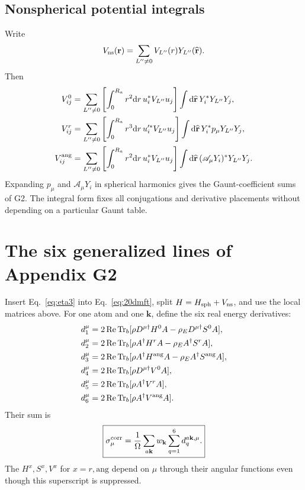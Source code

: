 \documentclass[11pt]{article}
\newcommand{\Tr}{\operatorname{Tr}}
\newcommand{\Rea}{\operatorname{Re}}
\newcommand{\dd}{\mathrm d}
\newcommand{\kb}{\mathbf k}
\newcommand{\rE}{{\rho_E}}
\newcommand{\newpart}[1]{\par\Needspace{12\baselineskip}\section{#1}}
\begin{document}
\subsection{Nonspherical potential integrals}
Write
\begin{equation}
 V_{\rm ns}(\mathbf r)=\sum_{L''\ne0}V_{L''}(r)Y_{L''}(\widehat{\mathbf r}).
\end{equation}
Then
\begin{align}
 V^0_{ij}&=\sum_{L''\ne0}
 \left[\int_0^{R_a}r^2\dd r\,u_i^*V_{L''}u_j\right]
 \int\dd\widehat{\mathbf r}\,Y_i^*Y_{L''}Y_j,\label{eq:V0}\\
 V^r_{ij}&=\sum_{L''\ne0}
 \left[\int_0^{R_a}r^3\dd r\,u_i'^*V_{L''}u_j\right]
 \int\dd\widehat{\mathbf r}\,Y_i^*p_\mu Y_{L''}Y_j,\label{eq:Vr}\\
 V^{\rm ang}_{ij}&=\sum_{L''\ne0}
 \left[\int_0^{R_a}r^2\dd r\,u_i^*V_{L''}u_j\right]
 \int\dd\widehat{\mathbf r}\,(\mathscr A_\mu Y_i)^*Y_{L''}Y_j.
 \label{eq:Va}
\end{align}
Expanding $p_\mu$ and $\mathscr A_\mu Y_i$ in spherical harmonics gives
the Gaunt-coefficient sums of G2. The integral form fixes all conjugations
and derivative placements without depending on a particular Gaunt table.

\newpart{The six generalized lines of Appendix G2}
\label{sec:g2}
Insert Eq.~\eqref{eq:eta3} into Eq.~\eqref{eq:20dmft}, split
$H=H_{\rm sph}+V_{\rm ns}$, and use the local matrices above.
For one atom and one $\kb$, define the six real energy derivatives:
\begin{align}
 d_1^\mu&=2\Rea\Tr_b[\rho D^{\mu\dagger}H^0A
                             -\rE D^{\mu\dagger}S^0A],\label{eq:g21}\\
 d_2^\mu&=2\Rea\Tr_b[\rho A^\dagger H^rA
                             -\rE A^\dagger S^rA],\label{eq:g22}\\
 d_3^\mu&=2\Rea\Tr_b[\rho A^\dagger H^{\rm ang}A
                             -\rE A^\dagger S^{\rm ang}A],\label{eq:g23}\\
 d_4^\mu&=2\Rea\Tr_b[\rho D^{\mu\dagger}V^0A],\label{eq:g24}\\
 d_5^\mu&=2\Rea\Tr_b[\rho A^\dagger V^rA],\label{eq:g25}\\
 d_6^\mu&=2\Rea\Tr_b[\rho A^\dagger V^{\rm ang}A].\label{eq:g26}
\end{align}
Their sum is
\begin{equation}
 \boxed{\sigma_\mu^{\rm corr}
 =\frac1\Omega\sum_{a\kb}w_\kb\sum_{q=1}^6d_q^{a\kb,\mu}.}
 \label{eq:G2full}
\end{equation}
The $H^x,S^x,V^x$ for $x=r,\mathrm{ang}$ depend on $\mu$ through
their angular functions even though this superscript is suppressed.
\end{document}
